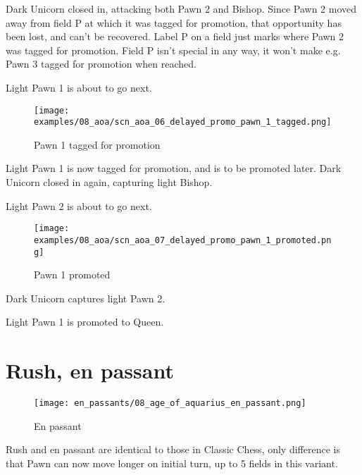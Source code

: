 Dark Unicorn closed in, attacking both Pawn 2 and Bishop. Since Pawn 2 moved
away from field P at which it was tagged for promotion, that opportunity has
been lost, and can't be recovered. Label P on a field just marks where Pawn 2
was tagged for promotion. Field P isn't special in any way, it won't make e.g.
Pawn 3 tagged for promotion when reached.

Light Pawn 1 is about to go next.

\clearpage %

\noindent
\begin{figure}[h]
\texttt{[image: examples/08\_aoa/scn\_aoa\_06\_delayed\_promo\_pawn\_1\_tagged.png]}
\caption{Pawn 1 tagged for promotion}
\label{fig:scn_aoa_06_delayed_promo_pawn_1_tagged}
\end{figure}

Light Pawn 1 is now tagged for promotion, and is to be promoted later.
Dark Unicorn closed in again, capturing light Bishop.

Light Pawn 2 is about to go next.

\clearpage %

\noindent
\begin{figure}[h]
\texttt{[image: examples/08\_aoa/scn\_aoa\_07\_delayed\_promo\_pawn\_1\_promoted.png]}
\caption{Pawn 1 promoted}
\label{fig:scn_aoa_07_delayed_promo_pawn_1_promoted}
\end{figure}

Dark Unicorn captures light Pawn 2.

Light Pawn 1 is promoted to Queen.

\clearpage %

\section*{Rush, en passant}

\noindent
\begin{wrapfigure}{l}{0.4\textwidth}
\centering
\texttt{[image: en\_passants/08\_age\_of\_aquarius\_en\_passant.png]}
\caption{En passant}
\label{fig:08_age_of_aquarius_en_passant}
\end{wrapfigure}
Rush and en passant are identical to those in Classic Chess, only difference
is that Pawn can now move longer on initial turn, up to 5 fields in this
variant.

